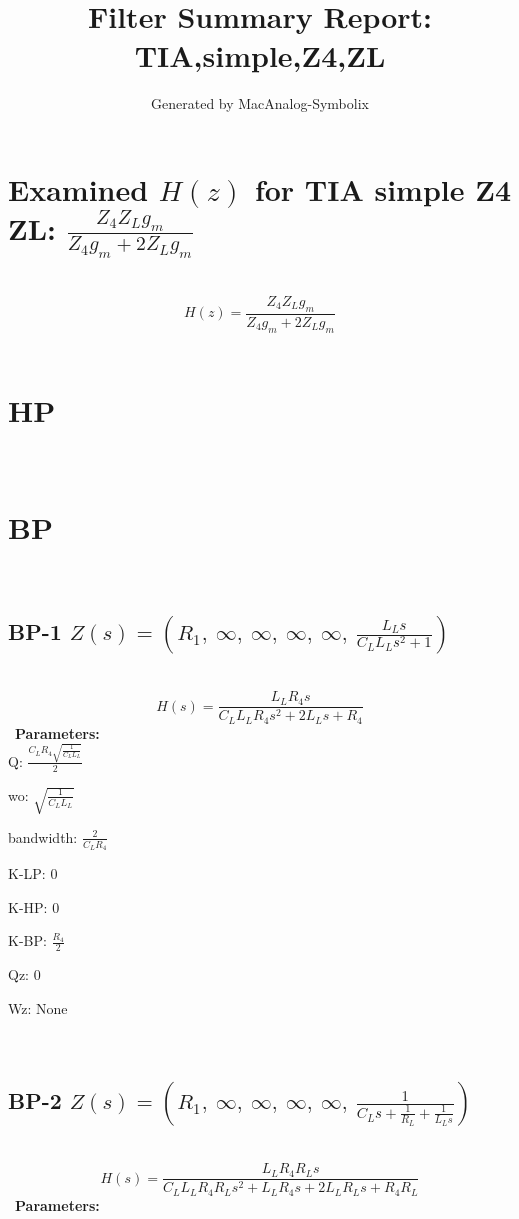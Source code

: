 \documentclass{article}
\begin{document}
        
                        \title{Filter Summary Report: TIA,simple,Z4,ZL}
                        \author{Generated by MacAnalog-Symbolix}
                        \maketitle

                        \tableofcontents
                        \newpage
                        \section{Examined $H(z)$ for TIA simple Z4 ZL: $\frac{Z_{4} Z_{L} g_{m}}{Z_{4} g_{m} + 2 Z_{L} g_{m}}$ }\ 
\textbf{\[H(z) = \frac{Z_{4} Z_{L} g_{m}}{Z_{4} g_{m} + 2 Z_{L} g_{m}}\] }\ 
\section{HP}\ 
\section{BP}\ 
\subsection{BP-1 $Z(s) = \left( R_{1}, \  \infty, \  \infty, \  \infty, \  \infty, \  \frac{L_{L} s}{C_{L} L_{L} s^{2} + 1}\right)$ } \ 
\textbf{\[H(s) = \frac{L_{L} R_{4} s}{C_{L} L_{L} R_{4} s^{2} + 2 L_{L} s + R_{4}}\] } \ 
\textbf{Parameters:}\\ 

Q: $\frac{C_{L} R_{4} \sqrt{\frac{1}{C_{L} L_{L}}}}{2}$\ 

wo: $\sqrt{\frac{1}{C_{L} L_{L}}}$\ 

bandwidth: $\frac{2}{C_{L} R_{4}}$\ 

K-LP: $0$\ 

K-HP: $0$\ 

K-BP: $\frac{R_{4}}{2}$\ 

Qz: $0$\ 

Wz: $\text{None}$\ 

\ 

\subsection{BP-2 $Z(s) = \left( R_{1}, \  \infty, \  \infty, \  \infty, \  \infty, \  \frac{1}{C_{L} s + \frac{1}{R_{L}} + \frac{1}{L_{L} s}}\right)$ } \ 
\textbf{\[H(s) = \frac{L_{L} R_{4} R_{L} s}{C_{L} L_{L} R_{4} R_{L} s^{2} + L_{L} R_{4} s + 2 L_{L} R_{L} s + R_{4} R_{L}}\] } \ 
\textbf{Parameters:}\\ 
\end{document}
